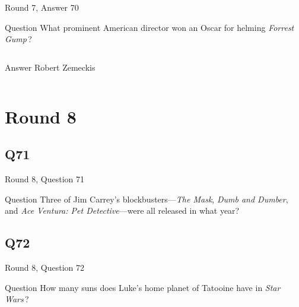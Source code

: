 \documentclass[11pt]{beamer}
\begin{document}
\begin{frame}[t]{Round 7, Answer 70}
  \vspace{2em}
  \begin{block}{Question}
    What prominent American director won an Oscar for helming \emph{Forrest Gump}\,?
  \end{block}
  \pause{}
  \begin{columns}[T,totalwidth=\linewidth]
    \begin{column}{0.35\linewidth}
      \begin{block}{Answer}
        Robert Zemeckis
      \end{block}
    \end{column}
    \begin{column}{0.6\linewidth}
      \begin{center}
        \texttt{[image: \{Images/gump]}.jpeg}
      \end{center}
    \end{column}
  \end{columns}
\end{frame}


\section{Round 8}


\subsection*{Q71}
\begin{frame}[t]{Round 8, Question 71}
  \vspace{2em}
  \begin{block}{Question}
    Three of Jim Carrey's blockbusters—\emph{The Mask}, \emph{Dumb and Dumber}, and \emph{Ace Ventura: Pet Detective}—were all released in what year?
  \end{block}
\end{frame}


\subsection*{Q72}
\begin{frame}[t]{Round 8, Question 72}
  \vspace{2em}
  \begin{block}{Question}
    How many suns does Luke's home planet of Tatooine have in \emph{Star Wars}\,?
  \end{block}
\end{frame}
\end{document}
